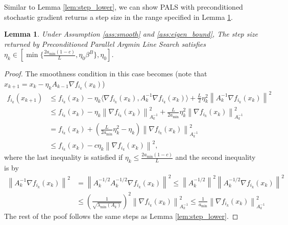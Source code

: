 \documentclass{article}
\newtheorem{lemma}[theorem]{Lemma}
\newcommand{\norm}[1]{\left \lVert #1 \right \rVert}
\begin{document}
Similar to Lemma \ref{lem:step_lower}, we can show PALS with preconditioned stochastic gradient returns a step size in the range specified in Lemma \ref{lem:step_lower_pred}.
\begin{lemma} \label{lem:step_lower_pred} Under Assumption \ref{ass:smooth} and \ref{ass:eigen_bound}, The step size returned by \textit{Preconditioned Parallel Argmin Line Search} satisfies $\eta_k \in \left[ \min\{ \frac{2 a_{\min} (1-c)}{L}, \eta_0 \beta^B\},  \eta_0 \right]$. 
    
\end{lemma}

\begin{proof}
    The smoothness condition in this case becomes (note that $x_{k+1} = x_k - \eta_k A_{k-1} \nabla f_{i_k} (x_k)$)
    \begin{align*}
        f_{i_k}(x_{k+1}) &\leq f_{i_k}(x_k) - \eta_k \langle \nabla f_{i_k} (x_k), A_k^{-1} \nabla f_{i_k}(x_k)\rangle + \frac{L}{2} \eta_k^2 \norm{A_k^{-1} \nabla f_{i_k} (x_k) }^2 \\
        &\leq f_{i_k}(x_k) - \eta_k \norm{\nabla f_{i_k}(x_k)}^2_{A_k^{-1}} + \frac{L}{2 a_{\min}} \eta_k^2 \norm{\nabla f_{i_k} (x_k)}^2_{A_k^{-1}} \\
        &= f_{i_k}(x_k) + (\frac{L}{2 a_{\min}} \eta_k^2 - \eta_k)  \norm{\nabla f_{i_k} (x_k)}^2_{A_k^{-1}} \\ 
        &\leq f_{i_k}(x_k) - c \eta_k \norm{\nabla f_{i_k}(x_k)}^2,
    \end{align*}
    where the last inequality is satisfied if $\eta_k \leq \frac{2 a_{\min} (1-c)}{L}$ and the second inequality is by 
    \begin{align*}
        \norm{A_k^{-1} \nabla f_{i_k} (x_k) }^2 &= \norm{A_{k}^{-1/2} A_k^{-1/2}\nabla f_{i_k} (x_k)}^2 \leq \norm{A_{k}^{-1/2}}^2 
        \norm{A_k^{-1/2}\nabla f_{i_k} (x_k)}^2 \\ 
        &\leq (\frac{1}{\sqrt{\lambda_{\min}(A_k)}})^2 \norm{\nabla f_{i_k} (x_k)}^2_{A_k^{-1}} \leq \frac{1}{a_{\min}} \norm{\nabla f_{i_k} (x_k)}^2_{A_k^{-1}}
    \end{align*}
    The rest of the poof follows the same steps as Lemma \ref{lem:step_lower}.
\end{proof}
\end{document}

